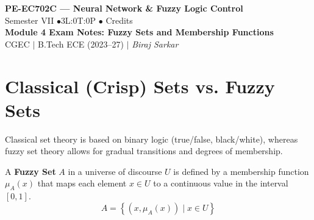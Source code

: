 \documentclass[12pt,a4paper]{article}
\begin{document}

\begin{center}
  {\LARGE\bfseries\color{myred} PE-EC702C --- Neural Network \& Fuzzy Logic Control}\\[5pt]
  {\normalsize\color{mydark} Semester VII \quad$\bullet$\quad 3L:0T:0P \quad$\bullet$ Credits}\\[3pt]
  {\normalsize\color{myteal}\textbf{Module 4 Exam Notes: Fuzzy Sets and Membership Functions}}\\[3pt]
  {\small\color{mydark} CGEC \;$|$\; B.Tech ECE (2023--27) \;$|$\; \textit{Biraj Sarkar}}
\end{center}
\vspace{2pt}
\noindent{\color{myred}\rule{\linewidth}{1.5pt}}
\vspace{2pt}

\hypersetup{linkcolor=mydark}
\tableofcontents
\hypersetup{linkcolor=myteal}
\newpage

\section{Classical (Crisp) Sets vs. Fuzzy Sets}

Classical set theory is based on binary logic (true/false, black/white), whereas fuzzy set theory allows for gradual transitions and degrees of membership.

\begin{tcolorbox}[defbox, title={Fuzzy Set}]
A \textbf{Fuzzy Set} $A$ in a universe of discourse $U$ is defined by a membership function $\mu_A(x)$ that maps each element $x \in U$ to a continuous value in the interval $[0, 1]$.
\begin{equation}
  A = \left\{ \left( x, \mu_A(x) \right) \mid x \in U \right\}
\end{equation}
\end{tcolorbox}
\end{document}
